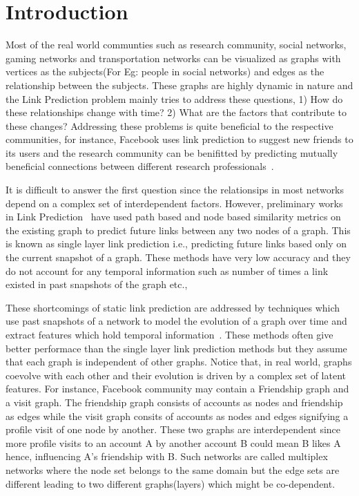 \section{Introduction}
\label{sec:intro}

Most of the real world communties such as research community, social networks,
gaming networks and  transportation networks can be visualized as graphs with
vertices as the subjects(For Eg: people in social networks) and  edges as the
relationship between the subjects. These graphs are highly dynamic in nature
and the Link Prediction problem mainly tries to address these  questions, 1) How
do these relationships change with time? 2) What are the factors that
contribute to these changes? Addressing these problems is quite beneficial to
the  respective communities, for instance, Facebook uses link prediction to
suggest new  friends to its users and the research community can be benifitted by
predicting mutually  beneficial connections between different research
professionals~\cite{tang2016scholat}.

It is difficult to answer the first question since the relationsips in most
networks depend on a complex set of interdependent factors. However,
preliminary  works in Link Prediction~\cite{liben2007link} have used path
based and node based similarity metrics on the existing graph to predict
future links between any two nodes of a graph. This is known as single layer link
prediction i.e., predicting  future links based only on the current snapshot
of a graph. These methods have very low accuracy and they do not account for
any temporal information such as number of times a link existed in past
snapshots of  the graph etc.,

These shortcomings of static link prediction are addressed by techniques which
use  past snapshots of a network to model the evolution of a graph over time
and extract  features which hold temporal
information~\cite{sarkar2012nonparametric}. These methods often give better
performace  than the single layer link prediction methods but they assume that
each graph is independent of other graphs. Notice that, in real world, graphs
coevolve with each other and their evolution is driven by a complex set of
latent features. For instance, Facebook  community may contain a Friendship
graph and a visit graph. The friendship graph  consists of accounts as nodes
and friendship as edges while the visit graph consits of  accounts as nodes
and edges signifying a profile visit of one node by another. These two graphs
are interdependent since more profile visits to an account A by another
account  B could mean B likes A hence, influencing A's friendship with B. Such
networks are called multiplex networks where the node set belongs to the same
domain  but the edge sets are different leading to two different
graphs(layers) which  might be co-dependent.

